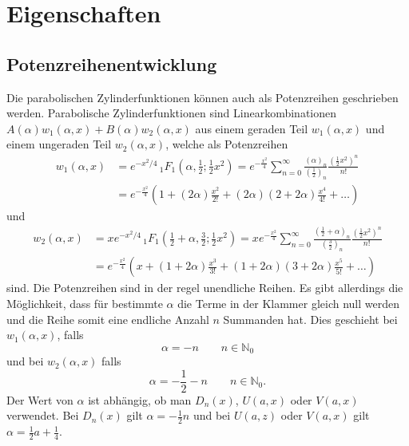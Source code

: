 %
%
%
\section{Eigenschaften
\label{parzyl:section:Eigenschaften}}

\subsection{Potenzreihenentwicklung
	\label{parzyl:potenz}}
Die parabolischen Zylinderfunktionen können auch als Potenzreihen geschrieben werden.
Parabolische Zylinderfunktionen sind Linearkombinationen 
$A(\alpha)w_1(\alpha, x) + B(\alpha)w_2(\alpha, x)$ aus einem geraden Teil $w_1(\alpha, x)$ 
und einem ungeraden Teil $w_2(\alpha, x)$, welche als Potenzreihen
\begin{align}
	w_1(\alpha,x)
	&=  
	e^{-x^2/4} \,
	{}_{1} F_{1}
	(
	\alpha, {\textstyle \frac{1}{2}} ; {\textstyle \frac{1}{2}}x^2) 
	= 
	e^{-\frac{x^2}{4}}
	\sum^{\infty}_{n=0}
	\frac{\left ( \alpha \right )_{n}}{\left ( \frac{1}{2}\right )_{n}}
	\frac{\left ( \frac{1}{2} x^2\right )^n}{n!} \\
	&=
	e^{-\frac{x^2}{4}}
	\left ( 
	1 
	+
	\left ( 2\alpha \right )\frac{x^2}{2!}
	+
	\left ( 2\alpha \right )\left ( 2 + 2\alpha \right )\frac{x^4}{4!}  
	+
	\dots
	\right )
\end{align}
und
\begin{align}
	w_2(\alpha,x)
	&=  
	xe^{-x^2/4} \,
	{}_{1} F_{1}
	(
	{\textstyle \frac{1}{2}} 
	+ \alpha, {\textstyle \frac{3}{2}} ; {\textstyle \frac{1}{2}}x^2) 
	= 
	xe^{-\frac{x^2}{4}}
	\sum^{\infty}_{n=0}
	\frac{\left ( \frac{1}{2} + \alpha \right )_{n}}{\left ( \frac{3}{2}\right )_{n}}
	\frac{\left ( \frac{1}{2} x^2\right )^n}{n!} \\
	&=
	e^{-\frac{x^2}{4}}
	\left ( 
	x 
	+
	\left ( 1 + 2\alpha \right )\frac{x^3}{3!}
	+
	\left ( 1 + 2\alpha \right )\left ( 3 + 2\alpha \right )\frac{x^5}{5!}  
	+
	\dots
	\right )
\end{align}
sind.
Die Potenzreihen sind in der regel unendliche Reihen. 
Es gibt allerdings die Möglichkeit, dass für bestimmte $\alpha$ die Terme in der Klammer gleich null werden 
und die Reihe somit eine endliche Anzahl $n$ Summanden hat.
Dies geschieht bei $w_1(\alpha,x)$, falls
\begin{equation}
	\alpha =  -n \qquad n \in \mathbb{N}_0
\end{equation}
und bei $w_2(\alpha,x)$ falls
\begin{equation}
	\alpha = -\frac{1}{2} - n \qquad n \in \mathbb{N}_0.
\end{equation}
Der Wert von $\alpha$ ist abhängig, ob man $D_n(x)$, $U(a,x)$ oder $V(a,x)$ verwendet.
Bei $D_n(x)$ gilt $\alpha = -{\textstyle \frac{1}{2}} n$ und bei $U(a,z)$ oder $V(a,x)$ gilt 
$\alpha = {\textstyle \frac{1}{2}} a + {\textstyle \frac{1}{4}}$.
